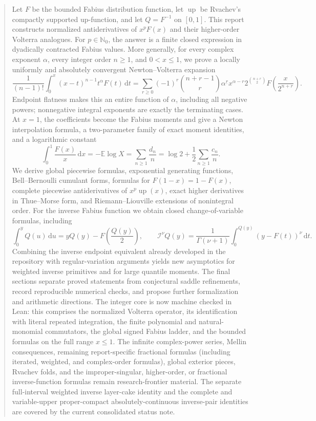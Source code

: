 \documentclass[11pt,oneside]{article}
\theoremstyle{definition}
\theoremstyle{remark}
\newcommand{\Up}{\operatorname{up}}
\newcommand{\E}{\mathbb E}
\newcommand{\N}{\mathbb N}
\newcommand{\dd}{\,\mathrm d}
\newcommand{\fall}[2]{#1^{\underline{#2}}}
\newcommand{\RL}{\mathcal I}
\newcommand{\1}{\mathbf 1}
\begin{document}
\begin{abstract}
Let \(F\) be the bounded Fabius distribution function, let \(\Up\) be Rvachev's
compactly supported up-function, and let \(Q=F^{-1}\) on \([0,1]\).  This report
constructs normalized antiderivatives of \(x^pF(x)\) and their higher-order
Volterra analogues.  For \(p\in\N_0\), the answer is a finite closed expression
in dyadically contracted Fabius values.  More generally, for every complex
exponent \(\alpha\), every integer order \(n\geq1\), and \(0<x\leq1\), we prove
a locally uniformly and absolutely convergent Newton--Volterra expansion
\[
 \frac1{(n-1)!}\int_0^x(x-t)^{n-1}t^\alpha F(t)\dd t
 =\sum_{r\geq0}(-1)^r\binom{n+r-1}{r}\fall{\alpha}{r}
 x^{\alpha-r}2^{\binom{n+r}{2}}F\!\left(\frac{x}{2^{n+r}}\right).
\]
Endpoint flatness makes this an entire function of \(\alpha\), including all
negative powers; nonnegative integral exponents are exactly the terminating
cases.  At \(x=1\), the coefficients become the Fabius moments and give a
Newton interpolation formula, a two-parameter family of exact moment
identities, and a logarithmic constant
\[
 \int_0^1\frac{F(x)}x\dd x
 =-\E\log X
 =\sum_{n\geq1}\frac{d_n}{n}
 =\log2+\frac12\sum_{n\geq1}\frac{c_n}{n}.
\]
We derive global piecewise formulas, exponential generating functions,
Bell--Bernoulli cumulant forms, formulas for \(F(1-x)=1-F(x)\), complete
piecewise antiderivatives of \(x^p\Up(x)\), exact higher derivatives in
Thue--Morse form, and Riemann--Liouville extensions of nonintegral order.
For the inverse Fabius function we obtain closed change-of-variable formulas,
including
\[
 \int_0^yQ(u)\dd u=yQ(y)-F\!\left(\frac{Q(y)}2\right),\qquad
 \RL^\nu Q(y)=\frac1{\Gamma(\nu+1)}
 \int_0^{Q(y)}(y-F(t))^\nu\dd t.
\]
Combining the inverse endpoint equivalent already developed in the repository
with regular-variation arguments yields new asymptotics for weighted inverse
primitives and for large quantile moments.  The final sections separate proved
statements from conjectural saddle refinements, record reproducible numerical
checks, and propose further formalization and arithmetic directions.  The
integer core is now machine checked in Lean: this comprises the normalized
Volterra operator, its identification with literal repeated integration, the
finite polynomial and natural-monomial commutators, the global signed Fabius
ladder, and the bounded formulas on the full range \(x\leq1\).  The infinite
complex-power series, Mellin consequences, remaining report-specific fractional formulas
(including iterated, weighted, and complex-order formulas), global exterior pieces,
Rvachev folds, and the improper-singular, higher-order, or fractional inverse-function
formulas remain research-frontier material.  The separate full-interval weighted inverse
layer-cake identity and the complete and variable-upper proper-compact
absolutely-continuous inverse-pair identities are covered by the current consolidated
status note.
\end{abstract}
\end{document}
